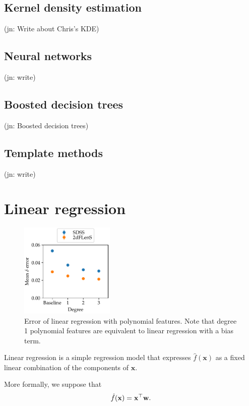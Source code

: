 \documentclass[11pt,twoside,openright]{report}
\newcommand\bw{\mathbf{w}}
\newcommand\bx{\mathbf{x}}
\newcommand\jn[1]{{\color{red}(jn: #1)}}
\begin{document}
\subsection{Kernel density estimation}

\jn{Write about Chris's KDE}

\subsection{Neural networks}

\jn{write}

\subsection{Boosted decision trees}

\jn{Boosted decision trees}

\subsection{Template methods}

\jn{write}

\section{Linear regression}
  \begin{figure}
    \centering
    \includegraphics[width=0.4\textwidth]{linreg_polynomial.pdf}
    \caption{Error of linear regression with polynomial features. Note that degree 1 polynomial features are equivalent to linear regression with a bias term.}
    \label{fig:linreg_polynomial}
  \end{figure}

Linear regression is a simple regression model that expresses $\hat f(\bx)$ as a fixed linear combination of the components of $\bx$.

More formally, we suppose that \[
  \hat f(\bx) = \bx^\top\bw \text.
\]
\end{document}
